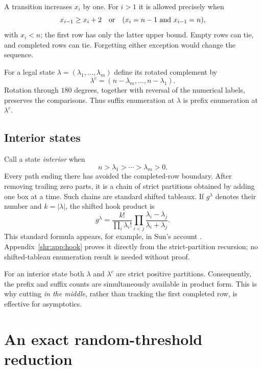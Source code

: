 \documentclass[11pt,letterpaper]{article}
\numberwithin{equation}{section}
\theoremstyle{definition}
\newcommand{\1}{\mathbf 1}
\begin{document}
A transition increases $x_i$ by one. For $i>1$ it is allowed precisely when
\begin{equation}
 x_{i-1}\ge x_i+2
 \quad\hbox{or}\quad (x_i=n-1\hbox{ and }x_{i-1}=n),
 \label{shr:eq:transition}
\end{equation}
with $x_i<n$; the first row has only the latter upper bound. Empty rows
can tie, and completed rows can tie. Forgetting either exception would
change the sequence.

For a legal state $\lambda=(\lambda_1,\ldots,\lambda_m)$ define its rotated
complement by
\begin{equation}
 \lambda^c=(n-\lambda_m,\ldots,n-\lambda_1).
 \label{shr:eq:complement}
\end{equation}
Rotation through $180$ degrees, together with reversal of the numerical
labels, preserves the comparisons. Thus suffix enumeration at $\lambda$
is prefix enumeration at $\lambda^c$.

\subsection{Interior states}
Call a state \emph{interior} when
\begin{equation}
 n>\lambda_1>\cdots>\lambda_m>0.
 \label{shr:eq:interior}
\end{equation}
Every path ending there has avoided the completed-row boundary. After
removing trailing zero parts, it is a chain of strict partitions obtained
by adding one box at a time. Such chains are standard shifted tableaux.
If $g^\lambda$ denotes their number and $k=|\lambda|$, the shifted hook
product is
\begin{equation}
 g^\lambda=\frac{k!}{\prod_i\lambda_i!}
 \prod_{i<j}\frac{\lambda_i-\lambda_j}{\lambda_i+\lambda_j}.
 \label{shr:eq:shiftedhook}
\end{equation}
This standard formula appears, for example, in Sun's account \cite{Sun}.
Appendix~\ref{shr:app:hook} proves it directly from the strict-partition
recursion; no shifted-tableau enumeration result is needed without proof.

For an interior state both $\lambda$ and $\lambda^c$ are strict positive
partitions. Consequently, the prefix and suffix counts are simultaneously
available in product form. This is why cutting \emph{in the middle}, rather
than tracking the first completed row, is effective for asymptotics.

\section{An exact random-threshold reduction}
\end{document}
